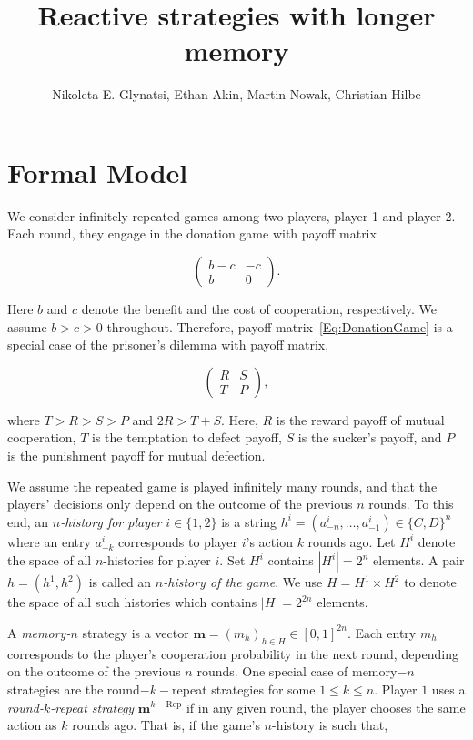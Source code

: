 \documentclass{article}
\title{Reactive strategies with longer memory}
\author{Nikoleta E. Glynatsi, Ethan Akin, Martin Nowak, Christian Hilbe}
\date{}
\theoremstyle{definition}
\begin{document}
\maketitle

\section{Formal Model}

We consider infinitely repeated games among two players, player 1 and
player 2. Each round, they engage in the donation game with payoff matrix

\begin{equation} \label{Eq:DonationGame}
\left(
\begin{array}{cc}
b-c	&-c\\
b	&0
\end{array}
\right).
\end{equation}

Here $b$ and $c$ denote the benefit and the cost of cooperation, respectively. 
We assume $b\!>\!c\!>\!0$ throughout.
Therefore, payoff matrix~\eqref{Eq:DonationGame} is a special case of the
prisoner's dilemma with payoff matrix,

\begin{equation} \label{Eq:PrisonerDilemma}
    \left(
    \begin{array}{cc}
    R & S\\
    T & P
    \end{array}
    \right),
\end{equation}

where $T > R > S > P$ and $2 R > T + S$. Here, $R$ is the reward payoff of mutual
cooperation, $T$ is the temptation to defect payoff, $S$ is the sucker's payoff,
and $P$ is the punishment payoff for mutual defection.

We assume the repeated game is played infinitely many rounds, and that the
players' decisions only depend on the outcome of the previous $n$ rounds. To
this end, an {\it $n$-history for player $i \in \{1, 2\}$} is a string
$h^i=(a^i_{-n},\ldots,a^i_{-1})\!\in\!\{C,D\}^n$ where an entry $a^i_{-k}$
corresponds to player $i$'s action $k$ rounds ago. Let $H^i$ denote the space of
all $n$-histories for player $i$. Set $H^i$ contains $|H^i|=2^{n}$ elements. A
pair $h\!=\!(h^1,h^2)$ is called an {\it $n$-history of the game}. We use
$H=H^1\times H^2$ to denote the space of all such histories which contains
$|H|=2^{2n}$ elements.

A {\it memory-$n$} strategy is a vector $\mathbf{m}=(m_h)_{h\in
H}\in[0,1]^{2n}$. Each entry $m_h$ corresponds to the player's cooperation
probability in the next round, depending on the outcome of the previous $n$
rounds. One special case of memory$-n$ strategies are the round$-k-$repeat
strategies for some $1\!\le\!k\!\le\!n$. Player $1$ uses a {\it round-$k$-repeat
strategy} $\mathbf{m}^{k-\text{Rep}}$ if in any given round, the player chooses
the same action as $k$ rounds ago. That is, if the game's $n$-history is such
that,
\end{document}
